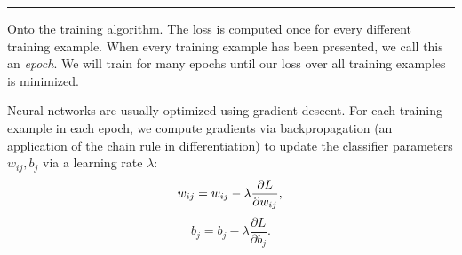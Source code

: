 %
%
%
%
%
%

\hspace{\fill}\rule{0.5\linewidth}{.5pt}\hspace{\fill}

Onto the training algorithm. The loss is computed once for every different training example. When every training example has been presented, we call this an \emph{epoch}. We will train for many epochs until our loss over all training examples is minimized.

Neural networks are usually optimized using gradient descent. For each training example in each epoch, we compute gradients via backpropagation (an application of the chain rule in differentiation) to update the classifier parameters $w_{ij}, b_j$ via a learning rate $\lambda$:
\begin{equation}
w_{ij} = w_{ij} - \lambda\frac{\partial L}{\partial w_{ij}}, \\
\label{eq:graddesc_updateweights}
\end{equation}
\begin{equation}
b_j = b_j - \lambda\frac{\partial L}{\partial b_j}.
\label{eq:graddesc_updatebias}
\end{equation}

